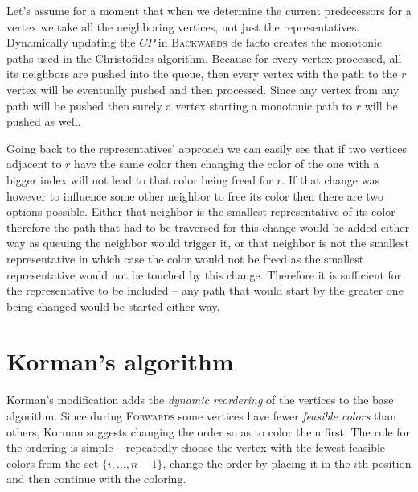 Let's assume for a moment that when we determine the current predecessors for a vertex we take all the neighboring vertices, not just the representatives. Dynamically updating the $CP$ in \textsc{Backwards} de facto creates the monotonic paths used in the Christofides algorithm. Because for every vertex processed, all its neighbors are pushed into the queue, then every vertex with the path to the $r$ vertex will be eventually pushed and then processed. Since any vertex from any path will be pushed then surely a vertex starting a monotonic path to $r$ will be pushed as well.

Going back to the representatives' approach we can easily see that if two vertices adjacent to $r$ have the same color then changing the color of the one with a bigger index will not lead to that color being freed for $r$. If that change was however to influence some other neighbor to free its color then there are two options possible. Either that neighbor is the smallest representative of its color -- therefore the path that had to be traversed for this change would be added either way as queuing the neighbor would trigger it, or that neighbor is not the smallest representative in which case the color would not be freed as the smallest representative would not be touched by this change. Therefore it is sufficient for the representative to be included -- any path that would start by the greater one being changed would be started either way.

\section{Korman's algorithm}
Korman's modification adds the \textit{dynamic reordering} of the vertices to the base algorithm. Since during \textsc{Forwards} some vertices have fewer \textit{feasible colors} than others, Korman suggests changing the order so as to color them first. The rule for the ordering is simple -- repeatedly choose the vertex with the fewest feasible colors from the set $\{i, \dots, n-1\}$, change the order by placing it in the $i$th position and then continue with the coloring.

\begin{alg}
	\label{alg:korman}
 \end{alg}

